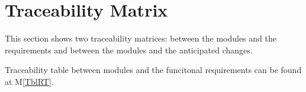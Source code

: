 \documentclass[12pt, titlepage]{article}
\newcommand{\mref}[1]{M\ref{#1}}
\begin{document}





\section{Traceability Matrix} \label{SecTM}

This section shows two traceability matrices: between the modules and the
requirements and between the modules and the anticipated changes.

Traceability table between modules and the funcitonal requirements can be found 
at \mref{TblRT}. \\
\end{document}
